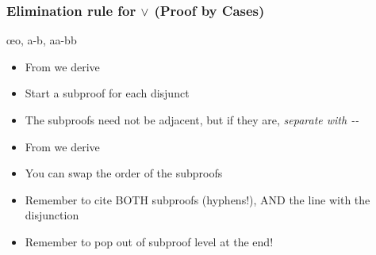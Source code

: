 \begin{frame}\footnotesize
  \frametitle{Elimination rule for $\vee$ (Proof by Cases)}

\begin{multicols}{2}

\begin{center}
  \begin{fitchproof}
    \open
     
    \ellipsesline
    \close
\breakline
    \open
     
    \ellipsesline
    \close
     \oe{o, a-b, aa-bb}
  \end{fitchproof}
  \end{center}

   \columnbreak
    
\begin{center}
 \begin{itemize}[<+->]

\item From  we derive 

\item Start a subproof for each disjunct

\item The subproofs need not be adjacent, but if they are, \emph{separate with -{}-}

\item From  we derive 

\item You can swap the order of the subproofs

\item Remember to cite BOTH subproofs (hyphens!), AND the line with the disjunction

\item Remember to pop out of subproof level at the end!

\end{itemize}

  \end{center}
  
\end{multicols}
  
\end{frame}


